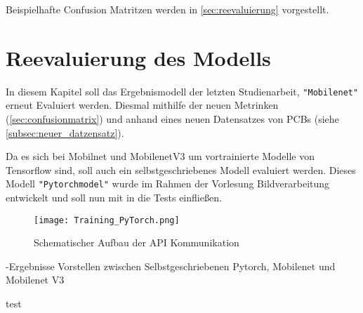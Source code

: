 Beispielhafte Confusion Matritzen werden in \autoref{sec:reevaluierung} vorgestellt.

\section{Reevaluierung des Modells} \label{sec:reevaluierung}

In diesem Kapitel soll das Ergebnismodell der letzten Studienarbeit, \texttt{"Mobilenet"} erneut Evaluiert werden. Diesmal mithilfe der neuen Metrinken (\autoref{sec:confusionmatrix}) und anhand eines neuen Datensatzes von PCBs (siehe \autoref{subsec:neuer_datzensatz}).

Da es sich bei Mobilnet und MobilenetV3 um vortrainierte Modelle von Tensorflow sind, soll auch ein selbstgeschriebenes Modell evaluiert werden. Dieses Modell \texttt{"Pytorchmodel"} wurde im Rahmen der Vorlesung Bildverarbeitung entwickelt und soll nun mit in die Tests einfließen. 

\begin{figure}[h]
    \centering
    \texttt{[image: Training\_PyTorch.png]}
    \caption{Schematischer Aufbau der API Kommunikation}
    \label{fig:Training_PyTorch}
\end{figure}

-Ergebnisse Vorstellen zwischen Selbstgeschriebenen Pytorch, Mobilenet und Mobilenet V3

test